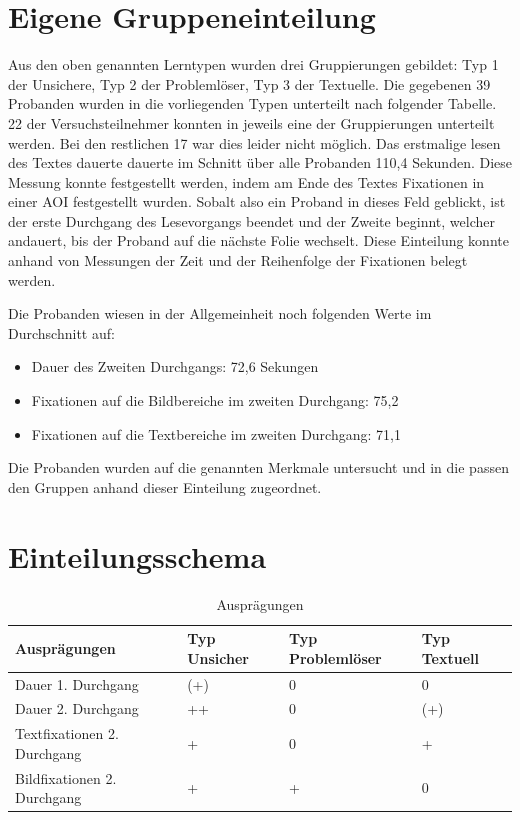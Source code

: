 \section{Eigene Gruppeneinteilung}

Aus den oben genannten Lerntypen wurden drei Gruppierungen gebildet: Typ 1 der Unsichere, Typ 2 der Problemlöser, Typ 3 der Textuelle. Die gegebenen 39 Probanden wurden in die vorliegenden Typen unterteilt nach folgender Tabelle. 22 der Versuchsteilnehmer konnten in jeweils eine der Gruppierungen unterteilt werden. Bei den restlichen 17 war dies leider nicht möglich. Das erstmalige lesen des Textes dauerte dauerte im Schnitt über alle Probanden 110,4 Sekunden. Diese Messung konnte festgestellt werden, indem am Ende des Textes Fixationen in einer AOI festgestellt wurden. Sobalt also ein Proband in dieses Feld geblickt, ist der erste Durchgang des Lesevorgangs beendet und der Zweite beginnt, welcher andauert, bis der Proband auf die nächste Folie wechselt. Diese Einteilung konnte anhand von Messungen der Zeit und der Reihenfolge der Fixationen belegt werden. 

Die Probanden wiesen in der Allgemeinheit noch folgenden Werte im Durchschnitt auf:
    \begin{itemize}
        \item Dauer des Zweiten Durchgangs: 72,6 Sekungen 
        \item Fixationen auf die Bildbereiche im zweiten Durchgang: 75,2
        \item Fixationen auf die Textbereiche im zweiten Durchgang: 71,1
    \end{itemize}

Die Probanden wurden auf die genannten Merkmale untersucht und in die passen den Gruppen anhand dieser Einteilung zugeordnet.
\section*{Einteilungsschema}

\begin{table}[!h]
\hspace{-5pt}
\begin{tabularx}{\textwidth + 5pt}{| @{\hspace{3pt}} M || @{\hspace{3pt}} M  | @{\hspace{3pt}} M  | @{\hspace{3pt}} M |}
\hline
\textbf{Ausprägungen} & \textbf{Typ Unsicher} & \textbf{Typ Problemlöser} & \textbf{Typ Textuell}\\
\hline
\hline
Dauer 1. Durchgang          & (+) & 0 & 0\\
\hline
Dauer 2. Durchgang          & ++ & 0 & (+)\\
\hline
Textfixationen 2. Durchgang & + & 0 & +\\
\hline
Bildfixationen 2. Durchgang & + & + & 0\\
\hline
\end{tabularx}
\caption{Ausprägungen}
\end{table}

